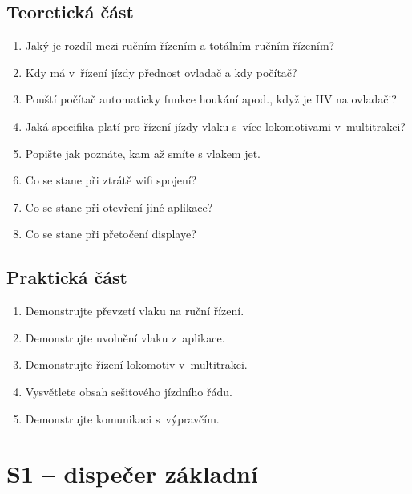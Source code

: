 \documentclass[12pt,a4paper]{article}
\begin{document}
\subsection*{Teoretická část}
\begin{enumerate}[leftmargin=*]
\item Jaký je rozdíl mezi ručním řízením a totálním ručním řízením?
\item Kdy má v~řízení jízdy přednost ovladač a kdy počítač?
\item Pouští počítač automaticky funkce houkání apod., když je HV na ovladači?
\item Jaká specifika platí pro řízení jízdy vlaku s~více lokomotivami v~multitrakci?
\item Popište jak poznáte, kam až smíte s vlakem jet.
\item Co se stane při ztrátě wifi spojení?
\item Co se stane při otevření jiné aplikace?
\item Co se stane při přetočení displaye?
\end{enumerate}

\subsection*{Praktická část}

\begin{enumerate}[leftmargin=*]
\item Demonstrujte převzetí vlaku na ruční řízení.
\item Demonstrujte uvolnění vlaku z~aplikace.
\item Demonstrujte řízení lokomotiv v~multitrakci.
\item Vysvětlete obsah sešitového jízdního řádu.
\item Demonstrujte komunikaci s~výpravčím.
\end{enumerate}

\section*{S1 – dispečer základní}
\end{document}
